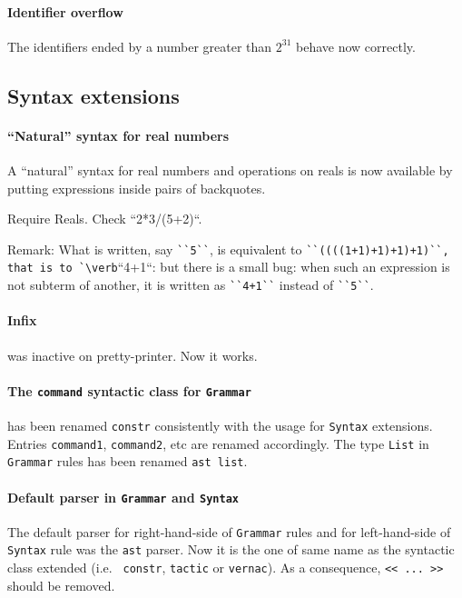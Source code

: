 \documentclass[11pt]{article}
\begin{document}
\paragraph{Identifier overflow} The identifiers ended by a number
greater than $2^{31}$ behave now correctly.

\subsection{Syntax extensions}
\label{SyntaxExtensions}

\paragraph{``Natural'' syntax for real numbers}

A ``natural'' syntax for real numbers and operations on reals is now
available by putting expressions inside pairs of backquotes.

\begin{coq_example}
Require Reals.
Check ``2*3/(5+2)``.
\end{coq_example}

Remark: What is written, say \verb:``5``:, is equivalent to
\verb:``((((1+1)+1)+1)+1)``, that is to `\verb:``4+1``: but there is a small
bug: when such an expression is not subterm of another, it is written
as \verb:``4+1``: instead of \verb:``5``:.

\paragraph{Infix} was inactive on pretty-printer. Now it works.

\paragraph{The {\tt command} syntactic class for {\tt Grammar}} has
been renamed {\tt constr} consistently with the usage for {\tt Syntax}
extensions. Entries {\tt command1}, {\tt command2}, etc are renamed
accordingly. The type {\tt List} in {\tt Grammar} rules has been
renamed {\tt ast list}.

\paragraph{Default parser in {\tt Grammar} and {\tt Syntax}}
\label{GrammarSyntax}

The default parser for right-hand-side of {\tt Grammar} rules and for
left-hand-side of {\tt Syntax} rule was the {\tt ast} parser.  Now it
is the one of same name as the syntactic class extended (i.e. {\tt
constr}, {\tt tactic} or {\tt vernac}). As a consequence, 
{\verb:<< ... >>:} should be removed.
\end{document}
